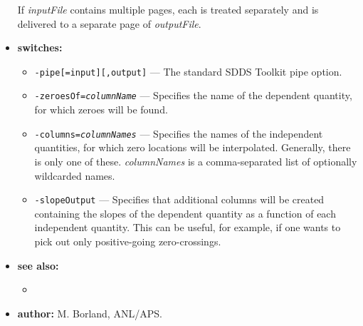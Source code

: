 \begin{itemize}
If {\em inputFile} contains multiple pages, each is treated separately and is delivered to a separate page of {\em
outputFile}.

\item {\bf switches:}
    \begin{itemize}
    \item \verb|-pipe[=input][,output]| --- The standard SDDS Toolkit pipe option.
    \item {\tt -zeroesOf={\em columnName}} --- Specifies the name of the dependent quantity, for which zeroes
        will be found.
    \item {\tt -columns={\em columnNames}} --- Specifies the names of the independent quantities, for which
        zero locations will be interpolated.  Generally, there is only one of these.  {\em columnNames}
        is a comma-separated list of optionally wildcarded names.
    \item {\tt -slopeOutput} --- Specifies that additional columns will be created containing the slopes of
        the dependent quantity as a function of each independent quantity.  This can be useful, for example,
        if one wants to pick out only positive-going zero-crossings.
    \end{itemize}
\item {\bf see also:}
    \begin{itemize}
    \item {}
    \end{itemize}
\item {\bf author:} M. Borland, ANL/APS.
\end{itemize}

